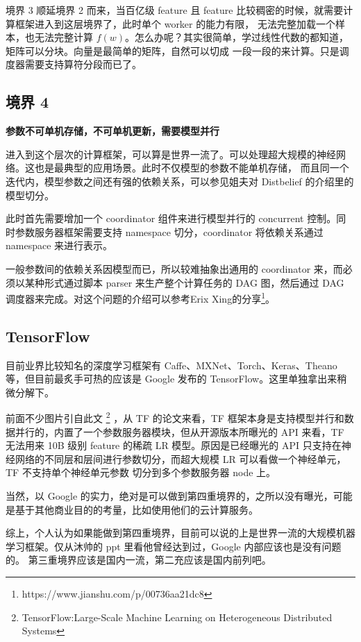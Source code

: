 境界 3 顺延境界 2 而来，当百亿级 feature 且 feature 比较稠密的时候，就需要计算框架进入到这层境界了，此时单个 worker 的能力有限，
无法完整加载一个样本，也无法完整计算 $f(w)$。怎么办呢？其实很简单，学过线性代数的都知道，矩阵可以分块。向量是最简单的矩阵，自然可以切成
一段一段的来计算。只是调度器需要支持算符分段而已了。

\subsection{境界 4}\label{subsec:fourth}

\noindent\textbf{参数不可单机存储，不可单机更新，需要模型并行}

进入到这个层次的计算框架，可以算是世界一流了。可以处理超大规模的神经网络。这也是最典型的应用场景。此时不仅模型的参数不能单机存储，
而且同一个迭代内，模型参数之间还有强的依赖关系，可以参见姐夫对 Distbelief 的介绍里的模型切分。

此时首先需要增加一个 coordinator 组件来进行模型并行的 concurrent 控制。同时参数服务器框架需要支持 namespace 切分，coordinator
将依赖关系通过 namespace 来进行表示。

一般参数间的依赖关系因模型而已，所以较难抽象出通用的 coordinator 来，而必须以某种形式通过脚本 parser 来生产整个计算任务的 DAG 图，然后通过 DAG 调度器来完成。对这个问题的介绍可以参考Erix Xing的分享\footnote{https://www.jianshu.com/p/00736aa21dc8}。

\subsection{TensorFlow}\label{subsec:tensorflow}

目前业界比较知名的深度学习框架有 Caffe、MXNet、Torch、Keras、Theano等，但目前最炙手可热的应该是 Google 发布的 TensorFlow。这里单独拿出来稍微分解下。

前面不少图片引自此文%
\footnote{TensorFlow:Large-Scale Machine Learning on Heterogeneous Distributed Systems}%
，从 TF 的论文来看，TF 框架本身是支持模型并行和数据并行的，内置了一个参数服务器模块，但从开源版本所曝光的 API 来看，TF 无法用来 10B 级别 feature
的稀疏 LR 模型。原因是已经曝光的 API 只支持在神经网络的不同层和层间进行参数切分，而超大规模 LR 可以看做一个神经单元，TF 不支持单个神经单元参数
切分到多个参数服务器 node 上。

当然，以 Google 的实力，绝对是可以做到第四重境界的，之所以没有曝光，可能是基于其他商业目的的考量，比如使用他们的云计算服务。

综上，个人认为如果能做到第四重境界，目前可以说的上是世界一流的大规模机器学习框架。仅从沐帅的 ppt 里看他曾经达到过，Google 内部应该也是没有问题的。
第三重境界应该是国内一流，第二充应该是国内前列吧。


